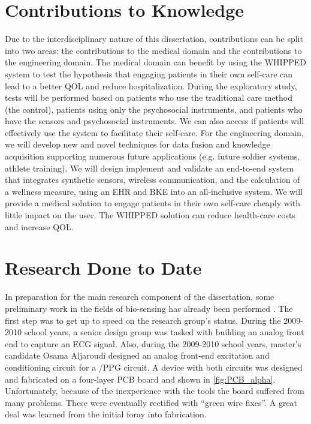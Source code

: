 \section{Contributions to Knowledge}
\label{sec:ContributionsToKnowledge}
Due to the interdisciplinary nature of this dissertation, contributions can be split into two areas: the contributions to the medical domain and the contributions to the engineering domain. The medical domain can benefit by using the WHIPPED system to test the hypothesis that engaging patients in their own self-care can lead to a better QOL and reduce hospitalization. During the exploratory study, tests will be performed based on patients who use the traditional care method (the control), patients using only the psychosocial instruments, and patients who have the sensors and psychosocial instruments. We can also access if patients will effectively use the system to facilitate their self-care.
For the engineering domain, we will develop new and novel techniques for data fusion and knowledge acquisition supporting numerous future applications (e.g. future soldier systems, athlete training). We will design implement and validate an end-to-end system that integrates synthetic sensors, wireless communication, and the calculation of a wellness measure, using an EHR and BKE into an all-inclusive system. We will provide a medical solution to engage patients in their own self-care cheaply with little impact on the user. The WHIPPED solution can reduce health-care costs and increase QOL. 

\section{Research Done to Date}
\label{sec:ResearchDoneToDate}
In preparation for the main research component of the dissertation, some preliminary work in the fields of bio-sensing has already been performed . The first step was to get up to speed on the research group's status. During the 2009-2010 school years, a senior design group was tasked with building an analog front end to capture an ECG signal. Also, during the 2009-2010 school years, master's candidate Osama Aljaroudi designed an analog front-end excitation and conditioning circuit for a /PPG circuit. A device with both circuits was designed and fabricated on a four-layer PCB board and shown in \cref{fig:PCB_alpha}. Unfortunately, because of the inexperience with the tools the board suffered from many problems. These were eventually rectified with “green wire fixes”. A great deal was learned from the initial foray into fabrication.

